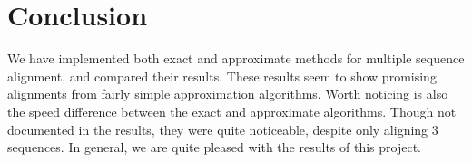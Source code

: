 \section{Conclusion}
We have implemented both exact and approximate methods for multiple sequence alignment, and compared their results. These results seem to show promising alignments from fairly simple approximation algorithms.
Worth noticing is also the speed difference between the exact and approximate algorithms. Though not documented in the results, they were quite noticeable, despite only aligning 3 sequences.
In general, we are quite pleased with the results of this project.